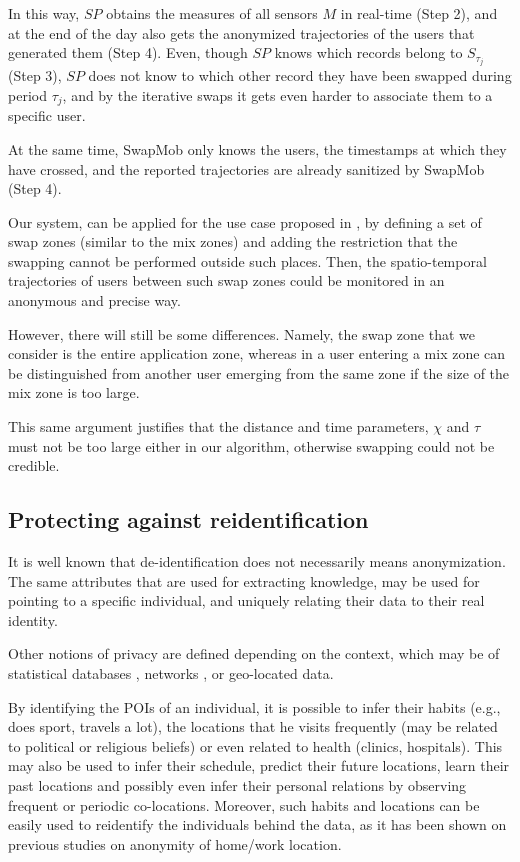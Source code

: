 \documentclass{llncs}
\begin{document}
In this way, $SP$ obtains the measures of all sensors $M$ in real-time (Step 2), and at the end of the day also gets the anonymized trajectories of the users that generated them (Step 4).
Even, though $SP$ knows which records belong to $S_{\tau_j}$ (Step 3), $SP$ does not know to which other record they have been swapped during period $\tau_j$, and by the iterative swaps it gets even harder to associate them to a specific user.

At the same time, SwapMob only knows the users, the timestamps at which they have crossed, and the reported trajectories are already sanitized by SwapMob (Step 4).

Our system, can be applied for the use case proposed in \cite{Beresford2003}, by defining a set of swap zones (similar to the mix zones) and adding the restriction that the swapping cannot be performed outside such places. Then, the spatio-temporal trajectories of users between such swap zones could be monitored in an anonymous and precise way.


However, there will still be some differences. Namely, the swap zone that we consider is the entire application zone, whereas in \cite{Beresford2003} a user entering a mix zone can be distinguished from another user emerging from the same zone if the size of the mix zone is too large.

This same argument justifies that the distance and time parameters, $\chi$ and $\tau$ must not be too large either in our algorithm, otherwise swapping could not be credible.



\subsection{Protecting against reidentification} %
It is well known that de-identification does not necessarily means anonymization. The same attributes that are used for extracting knowledge, may be used for pointing to a specific individual, and uniquely relating their data to their real identity.

Other notions of privacy are defined depending on the context, which may be of statistical databases \cite{Danezis15}, networks \cite{Zhou:2008}, or geo-located data.

By identifying the POIs of an individual, it is possible to infer their habits (e.g., does sport, travels a lot), the locations that he visits frequently (may be related to political or religious beliefs) or even related to health (clinics, hospitals). This may also be used to infer their schedule, predict their future locations, learn their past locations and possibly even infer their personal relations by observing frequent or periodic co-locations.
Moreover, such habits and locations can be easily used to reidentify the individuals behind the data, as it has been shown on previous studies on anonymity of home/work location.
\end{document}
